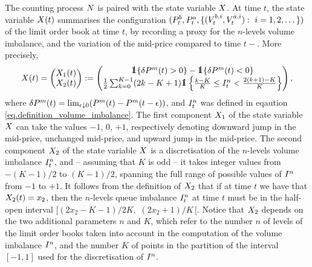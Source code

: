 \documentclass[10pt]{article}
\begin{document}
The counting process $\multiCountingProc$ is paired with the state variable $\stateVariable$. At time $t$, the state variable $\stateVariable(t)$ summarises the configuration $(\bestBidPrice_t,\bestAskPrice_t,\lbrace( \nthBestBidVolume[i]_t, \nthBestAskVolume[i]_t): \, \, i=1,2,\dots \rbrace)$ of the limit order book at time $t$, by recording a proxy for the $n$-levels volume imbalance, and the variation of the mid-price compared to time $t-$. More precisely, 
\begin{equation}\label{eq.state-variable}
 \stateVariable(t)
 =
 \begin{pmatrix}
 \stateVariable_1 (t)
 \\
 \stateVariable_2(t)
 \end{pmatrix}
 :=
 \begin{pmatrix}
 \one\lbrace\delta\midprice(t)>0\rbrace - \one\lbrace\delta\midprice(t)<0\rbrace
 \\
 \half\sum_{k=0}^{K-1} (2k-K+1 )\one\left\lbrace \frac{k-K}{K} \leq \volumeImbalance^n_t < \frac{2(k+1)-K}{K} \right\rbrace
 \end{pmatrix},
\end{equation}
where $\delta\midprice(t) = \lim_{\epsilon\downarrow 0} (\midprice(t) - \midprice(t-\epsilon) )$, and $\volumeImbalance^{n}_t$ was defined in eqaution \eqref{eq.definition_volume_imbalance}. The first component $\stateVariable_1$ of the state variable $\stateVariable$ can take the values $-1$, $0$, $+1$, respectively denoting downward jump in the mid-price, unchanged mid-price, and upward jump in the mid-price. The second component $\stateVariable_2$ of the state variable $\stateVariable$ is a discretisation of the $n$-levels volume imbalance $\volumeImbalance^{n}_t$, and -- assuming that $K$ is odd -- it takes integer values from $-(K-1)/2$ to $(K-1)/2$, spanning the full range of possible values of $\volumeImbalance^n$ from $-1$ to $+1$. 
It follows from the definition of $\stateVariable_2$ that if at time $t$ we have that $\stateVariable_2 (t) = x_2$, then the $n$-levels queue imbalance $\volumeImbalance^n_t$ at time $t$ must be in the half-open interval $[(2x_2 -K -1)/2K, \, \, (2x_2 +1)/K \, [$.
Notice that $\stateVariable_2$ depends on the two additional parameters $n$ and $K$, which refer to the number $n$ of levels of the limit order books taken into account in the computation of the volume imbalance $\volumeImbalance^n$, and the number $K$ of points in the partition of the interval $[-1,1]$  used for the discretisation of $\volumeImbalance^n$. 
\end{document}
